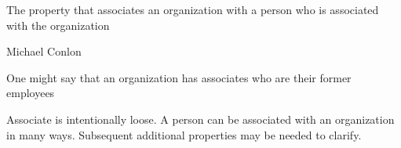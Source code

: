 \documentclass[letterpaper,10pt,english]{sphinxmanual}
\begin{document}
\begin{sphinxShadowBox}

\sphinxAtStartPar
The property that associates an organization with a person who is associated with the organization
\end{sphinxShadowBox}

\begin{sphinxShadowBox}

\sphinxAtStartPar
Michael Conlon 
\end{sphinxShadowBox}

\begin{sphinxShadowBox}

\sphinxAtStartPar
{\hyperref[\detokenize{doc-ORG_0000001::doc}]{}}
\end{sphinxShadowBox}

\begin{sphinxShadowBox}

\sphinxAtStartPar
{\hyperref[\detokenize{doc-NCBITaxon_9606::doc}]{}}
\end{sphinxShadowBox}

\begin{sphinxShadowBox}

\sphinxAtStartPar
{\hyperref[\detokenize{doc-ORG_2000019::doc}]{}}
\end{sphinxShadowBox}

\begin{sphinxShadowBox}

\sphinxAtStartPar
One might say that an organization has associates who are their former employees
\end{sphinxShadowBox}

\begin{sphinxShadowBox}

\sphinxAtStartPar
Associate is intentionally loose.  A person can be associated with an organization in many ways.  Subsequent additional properties may be needed to clarify.
\end{sphinxShadowBox}
\end{document}
